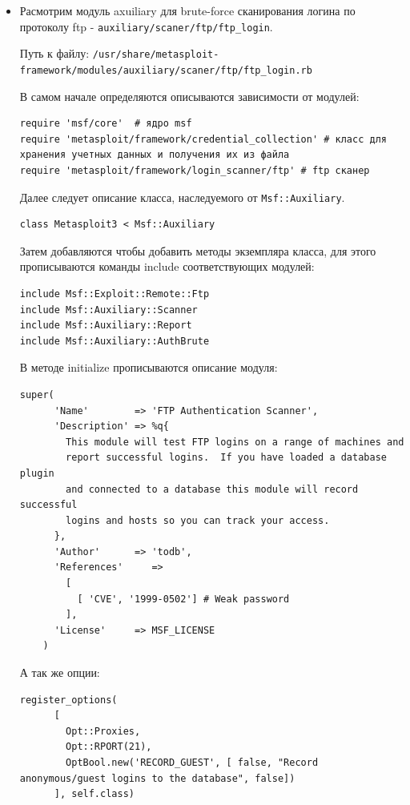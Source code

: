 \documentclass[11pt, a4paper]{article}		%
\begin{document}
\begin{itemize}

\item Расмотрим модуль axuiliary для brute-force сканирования логина по протоколу ftp - \verb'auxiliary/scaner/ftp/ftp_login'.

Путь к файлу: \verb'/usr/share/metasploit-framework/modules/auxiliary/scaner/ftp/ftp_login.rb'

В самом начале определяются описываются зависимости от модулей:

\begin{verbatim}
require 'msf/core'	# ядро msf
require 'metasploit/framework/credential_collection' # класс для хранения учетных данных и получения их из файла
require 'metasploit/framework/login_scanner/ftp' # ftp сканер
\end{verbatim}

Далее следует описание класса, наследуемого от \verb'Msf::Auxiliary'.

\begin{verbatim}
class Metasploit3 < Msf::Auxiliary
\end{verbatim}

Затем добавляются чтобы добавить методы экземпляра класса, для этого прописываются команды include соответствующих модулей:

\begin{verbatim}
include Msf::Exploit::Remote::Ftp
include Msf::Auxiliary::Scanner
include Msf::Auxiliary::Report
include Msf::Auxiliary::AuthBrute
\end{verbatim}

В методе initialize прописываются описание модуля: 

\begin{verbatim}
super(
      'Name'        => 'FTP Authentication Scanner',
      'Description' => %q{
        This module will test FTP logins on a range of machines and
        report successful logins.  If you have loaded a database plugin
        and connected to a database this module will record successful
        logins and hosts so you can track your access.
      },
      'Author'      => 'todb',
      'References'     =>
        [
          [ 'CVE', '1999-0502'] # Weak password
        ],
      'License'     => MSF_LICENSE
    )
\end{verbatim}

А так же опции: 

\begin{verbatim}
register_options(
      [
        Opt::Proxies,
        Opt::RPORT(21),
        OptBool.new('RECORD_GUEST', [ false, "Record anonymous/guest logins to the database", false])
      ], self.class)


\end{verbatim}
\end{itemize}
\end{document}
